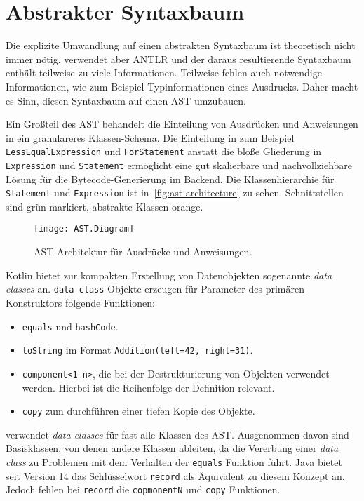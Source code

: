 \section{Abstrakter Syntaxbaum}

Die explizite Umwandlung auf einen abstrakten Syntaxbaum ist theoretisch nicht immer nötig. \Toya verwendet aber ANTLR und der daraus resultierende Syntaxbaum enthält teilweise zu viele Informationen. Teilweise fehlen auch notwendige Informationen, wie zum Beispiel Typinformationen eines Ausdrucks. Daher macht es Sinn, diesen Syntaxbaum auf einen AST umzubauen.

Ein Großteil des AST behandelt die Einteilung von Ausdrücken und Anweisungen in ein granulareres Klassen-Schema. Die Einteilung in zum Beispiel \texttt{LessEqualExpression} und \texttt{ForStatement} anstatt die bloße Gliederung in \texttt{Expression} und \texttt{Statement} ermöglicht eine gut skalierbare und nachvollziehbare Lösung für die Bytecode-Generierung im Backend. Die Klassenhierarchie für \texttt{Statement} und \texttt{Expression} ist in~\autoref{fig:ast-architecture} zu sehen. Schnittstellen sind grün markiert, abstrakte Klassen orange.

\begin{figure}[h]
    \caption{AST-Architektur für Ausdrücke und Anweisungen.}
    \centering
    \texttt{[image: AST.Diagram]}
    \label{fig:ast-architecture}
\end{figure}

Kotlin bietet zur kompakten Erstellung von Datenobjekten sogenannte \textit{data classes} an. \texttt{data class} Objekte erzeugen für Parameter des primären Konstruktors folgende Funktionen:

\begin{itemize}
    \item \texttt{equals} und \texttt{hashCode}.
    \item \texttt{toString} im Format \texttt{Addition(left=42, right=31)}.
    \item \texttt{component<1-n>}, die bei der Destrukturierung von Objekten verwendet werden. Hierbei ist die Reihenfolge der Definition relevant.
    \item \texttt{copy} zum durchführen einer tiefen Kopie des Objekte.
\end{itemize}

\Toya verwendet \textit{data classes} für fast alle Klassen des AST. Ausgenommen davon sind Basisklassen, von denen andere Klassen ableiten, da die Vererbung einer \textit{data class} zu Problemen mit dem Verhalten der \texttt{equals} Funktion führt. Java bietet seit Version 14 das Schlüsselwort \texttt{record} als Äquivalent zu diesem Konzept an. Jedoch fehlen bei \texttt{record} die \texttt{copmonentN} und \texttt{copy} Funktionen.

